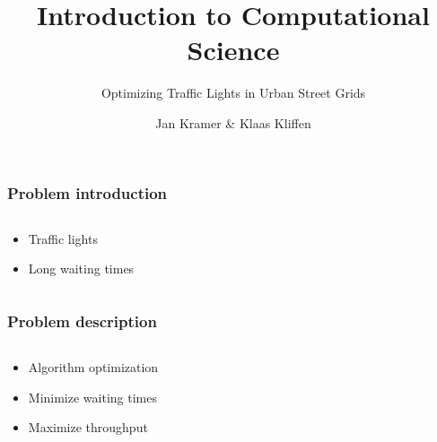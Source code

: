 \documentclass[11pt]{beamer}
\title{Introduction to Computational Science}
\subtitle{Optimizing Traffic Lights in Urban Street Grids}
\author{Jan Kramer \& Klaas Kliffen}
\begin{document}
\maketitle

\begin{frame}
\frametitle{Problem introduction}
\begin{columns}
    \begin{column}{.5\textwidth}
        \begin{itemize}
            \item Traffic lights
            \item Long waiting times
        \end{itemize}
    \end{column}
    \begin{column}{.5\textwidth}
    \end{column}
\end{columns}
\end{frame}


\begin{frame}
\frametitle{Problem description}
\begin{columns}
    \begin{column}{.5\textwidth}
        \begin{itemize}
            \item Algorithm optimization
            \item Minimize waiting times
            \item Maximize throughput
        \end{itemize}
    \end{column}
    \begin{column}{.5\textwidth}
    \end{column}
\end{columns}
\end{frame}
\end{document}
